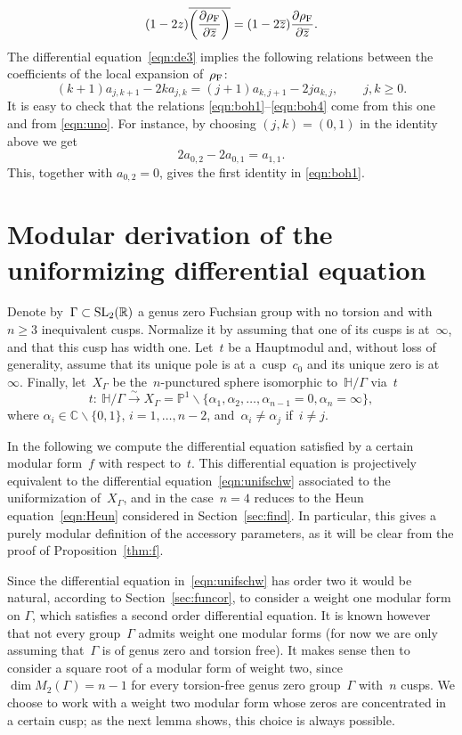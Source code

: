 \documentclass[pdftex]{sigma}
\newcommand{\C}{\mathbb{C}}
\newcommand{\R}{\mathbb{R}}
\newcommand{\pro}{\mathbb{P}}
\newcommand{\Po}{\mathbb{H}}
\numberwithin{equation}{section}
\begin{document}
\begin{equation}\label{eqn:de3}
(1-2z)\overline{\left(\frac{\partial\rho_{\rm F}}{\partial\overline{z}}\right)} = (1-2\overline{z})\frac{\partial\rho_{\rm F}}{\partial\overline{z}}.
\end{equation}
The differential equation~\eqref{eqn:de3} implies the following relations between the coefficients of the local expansion of~$\rho_{\rm F}$:
\[
(k+1)a_{j,k+1}-2ka_{j,k}=(j+1)a_{k,j+1}-2ja_{k,j},\qquad j,k\ge 0.
\]
It is easy to check that the relations \eqref{eqn:boh1}--\eqref{eqn:boh4} come from this one and from \eqref{eqn:uno}. For instance, by choosing $(j,k)=(0,1)$ in the identity above we get
\[
2a_{0,2}-2a_{0,1}=a_{1,1}.
\]
This, together with $a_{0,2}=0$, gives the first identity in \eqref{eqn:boh1}.

\appendix

\section{Modular derivation of the uniformizing differential equation}\label{appendixA}
Denote by~$\Gamma\subset{\rm SL}_2(\R)$ a genus zero Fuchsian group with no torsion and with~$n\ge 3$ inequivalent cusps. Normalize it by assuming that one of its cusps is at~$\infty$, and that this cusp has width one. Let~$t$ be a Hauptmodul and, without loss of generality, assume that its unique pole is at a~cusp~$c_0$ and its unique zero is at~$\infty$. Finally, let~$X_\Gamma$ be the~$n$-punctured sphere isomorphic to~$\Po/\Gamma$ via~$t$
\[
t\colon \ \Po/\Gamma \overset{\sim}{\rightarrow} X_\Gamma=\pro^1 \smallsetminus \{\alpha_1,\alpha_2,\dots,\alpha_{n-1}=0 ,\alpha_n=\infty\},
\]
where $\alpha_i\in\C\smallsetminus\{0,1\}$, $i=1,\dots,n-2$, and~$\alpha_i\neq\alpha_j$ if~$i\neq j$.

In the following we compute the differential equation satisfied by a certain modular form~$f$ with respect to~$t$. This differential equation is projectively equivalent to the differential equation~\eqref{eqn:unifschw} associated to the uniformization of~$X_\Gamma$, and in the case~$n=4$ reduces to the Heun equation~\eqref{eqn:Heun} considered in Section~\ref{sec:find}. In particular, this gives a purely modular definition of the accessory parameters, as it will be clear from the proof of Proposition~\ref{thm:f}.

Since the differential equation in~\eqref{eqn:unifschw} has order two it would be natural, according to Section~\ref{sec:funcor}, to consider a weight one modular form on $\Gamma$, which satisfies a second order differential equation. It is known however that not every group~$\Gamma$ admits weight one modular forms (for now we are only assuming that~$\Gamma$ is of genus zero and torsion free). It makes sense then to consider a square root of a modular form of weight two, since $\dim{M_2(\Gamma)}=n-1$ for every torsion-free genus zero group~$\Gamma$ with~$n$ cusps.
We choose to work with a weight two modular form whose zeros are concentrated in a certain cusp; as the next lemma shows, this choice is always possible.
\end{document}

